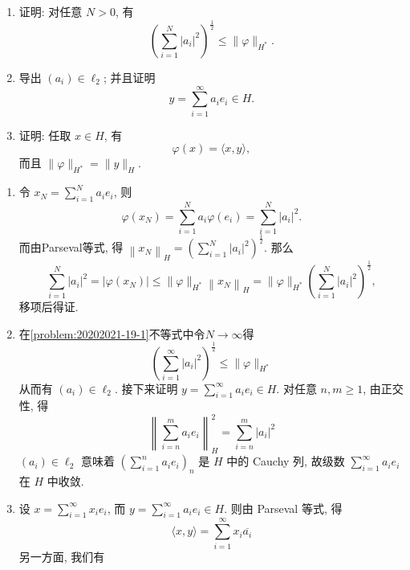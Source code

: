 \begin{enumerate}
            \begin{enumerate}
                \item\label{problem:20202021-19-1} 证明: 对任意 $N>0$, 有
                \[
                \left(\sum_{i=1}^{N}\left|a_{i}\right|^{2}\right)^{\frac{1}{2}} \leq\|\varphi\|_{H^{*}}.
                \]
                \item 导出 $\left(a_{i}\right) \in \ell_{2}$; 并且证明
                \[
                y=\sum_{i=1}^{\infty} a_{i} e_{i} \in H.
                \]
                \item 证明: 任取 $x \in H$, 有
                \[
                \varphi(x)=\langle x, y\rangle,
                \]
                而且 $\|\varphi\|_{H^{*}}=\|y\|_{H}$.
            \end{enumerate}
            \begin{answer}
                \begin{enumerate}
                    \item 
                    令 $x_{N}=\sum\limits_{i=1}^{N} a_{i} e_{i}$, 则
                    \[
                        \varphi\left(x_{N}\right)=\sum_{i=1}^{N} a_{i} \varphi\left(e_{i}\right)=\sum_{i=1}^{N}\left|a_{i}\right|^{2} .\]
                    而由Parseval等式, 得 $\left\|x_{N}\right\|_{H}=\left(\sum\limits_{i=1}^{N}\left|a_{i}\right|^{2}\right)^{\frac{1}{2}}$. 那么
                    \[
                        \sum\limits_{i=1}^{N}\left|a_{i}\right|^{2}=\left|\varphi\left(x_{N}\right)\right| \leq\|\varphi\|_{H^{*}}\left\|x_{N}\right\|_{H} =\|\varphi\|_{H^{*}}\left(\sum\limits_{i=1}^{N}\left|a_{i}\right|^{2}\right)^{\frac{1}{2}},
                    \]移项后得证.
                \item 在\ref{problem:20202021-19-1}不等式中令$N\to \infty$得
                \[
                    \left(\sum_{i=1}^{\infty}\left|a_{i}\right|^{2}\right)^{\frac{1}{2}} \leq\|\varphi\|_{H^{*}}
                \]
                从而有 $\left(a_{i}\right) \in \ell_{2}$. 接下来证明 $y=\sum\limits_{i=1}^{\infty} a_{i} e_{i} \in H$. 对任意 $n, m \geq 1$, 由正交性, 得
                \[
                    \left\|\sum_{i=n}^{m} a_{i} e_{i}\right\|_{H}^{2}=\sum_{i=n}^{m}\left|a_{i}\right|^{2}
                \]
                $\left(a_{i}\right) \in \ell_{2}$ 意味着 $\left(\sum\limits_{i=1}^{n} a_{i} e_{i}\right)_{n}$ 是 $H$ 中的 Cauchy 列, 故级数 $\sum\limits_{i=1}^{\infty} a_{i} e_{i}$ 在 $H$ 中收敛.
                \item 设 $x=\sum\limits_{i=1}^{\infty} x_{i} e_{i}$, 而 $y=\sum\limits_{i=1}^{\infty} a_{i} e_{i} \in H$. 则由 Parseval 等式, 得\[\langle x, y\rangle=\sum_{i=1}^{\infty} x_{i} \overline{a_{i}}\]另一方面, 我们有

\end{enumerate}
\end{answer}
\end{enumerate}
